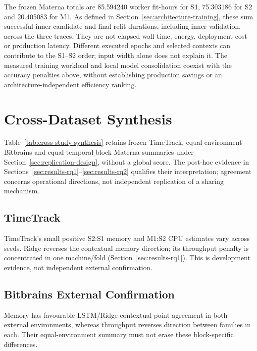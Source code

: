 \documentclass[a4paper,fleqn]{cas-dc}
\begin{document}


The frozen Materna totals are 85.594240 worker fit-hours for S1, 75.303186 for
S2 and 20.405083 for M1. As defined in Section~\ref{sec:architecture-training},
these sum successful inner-candidate and final-refit durations, including
inner validation, across the three traces. They are not elapsed wall time,
energy, deployment cost or production latency. Different executed epochs and
selected contexts can contribute to the S1--S2 order; input width alone does
not explain it. The measured training workload and local model consolidation
coexist with the accuracy penalties above, without establishing production
savings or an architecture-independent efficiency ranking.

\section{Cross-Dataset Synthesis}
\label{sec:cross-dataset-synthesis}

Table~\ref{tab:cross-study-synthesis} retains frozen TimeTrack,
equal-environment Bitbrains and equal-temporal-block Materna summaries under
Section~\ref{sec:replication-design}, without a global score.
The post-hoc evidence in Sections~\ref{sec:results-rq1}--\ref{sec:results-rq2}
qualifies their interpretation; agreement concerns operational directions,
not independent replication of a sharing mechanism.



\subsection{TimeTrack}

TimeTrack's small positive S2:S1 memory and M1:S2 CPU estimates vary across
seeds. Ridge reverses the contextual memory direction; its throughput penalty
is concentrated in one machine/fold (Section~\ref{sec:results-rq1}).
This is development evidence, not independent external confirmation.

\subsection{Bitbrains External Confirmation}

Memory has favourable LSTM/Ridge contextual point agreement in both external
environments, whereas throughput reverses direction between families in each.
Their equal-environment summary must not erase these block-specific differences.
\end{document}
